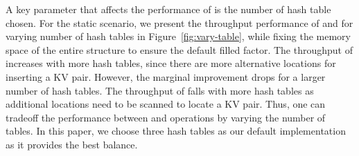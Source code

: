A key parameter that affects the performance of \voter is the number of hash table chosen. For the static scenario, we present the throughput performance of  and  for varying number of hash tables in Figure~\ref{fig:vary-table}, while fixing the memory space of the entire structure to ensure the default filled factor. 
The throughput of  increases with more hash tables, since there are more alternative locations for inserting a KV pair. However, the marginal improvement drops for a larger number of hash tables. The throughput of  falls with more hash tables as additional locations need to be scanned to locate a KV pair. Thus, one can tradeoff the performance between  and  operations by varying the number of tables.
In this paper, we choose three hash tables as our default implementation as it provides the best balance. 


